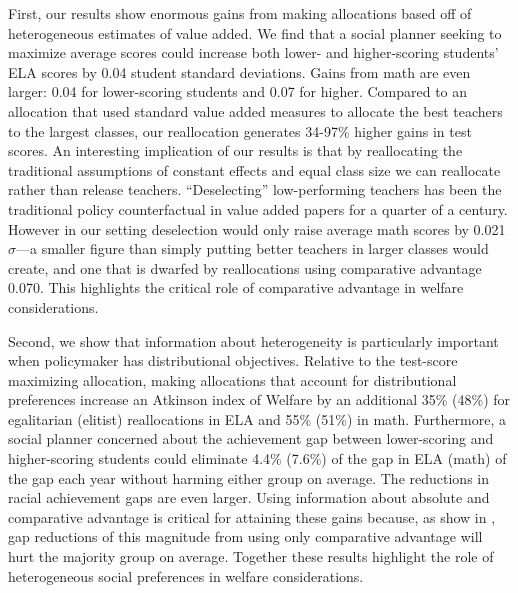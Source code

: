 \documentclass[12pt]{article}
\theoremstyle{definition}
\theoremstyle{definition}
\theoremstyle{definition}
\theoremstyle{definition}
\begin{document}
First, our results show enormous gains from making allocations based off of heterogeneous estimates of value added. We find that a social planner seeking to maximize average scores could increase both lower- and higher-scoring students' ELA scores by 0.04 student standard deviations. Gains from math are even larger: 0.04 for lower-scoring students and 0.07 for higher. Compared to an allocation that used standard value added measures to allocate the best teachers to the largest classes, our reallocation generates 34-97\% higher gains in test scores. An interesting implication of our results is that by reallocating the traditional assumptions of constant effects and equal class size we can reallocate rather than release teachers. ``Deselecting'' low-performing teachers has been the traditional policy counterfactual in value added papers for a quarter of a century. However in our setting deselection would only raise average math scores by 0.021 $\sigma$---a smaller figure than  simply putting better teachers in larger classes would create, and one that is dwarfed by reallocations using comparative advantage 0.070. This highlights the critical role of comparative advantage in welfare considerations. 

Second, we show that information about heterogeneity is particularly important when policymaker 
has distributional objectives. Relative to the test-score maximizing allocation, making allocations that account for distributional preferences increase an Atkinson index of Welfare by an additional 35\% (48\%) for egalitarian (elitist) reallocations in ELA and 55\% (51\%) in math. Furthermore, a social planner concerned about the achievement gap between lower-scoring and higher-scoring students could eliminate 4.4\% (7.6\%) of the gap in ELA (math) of the gap each year without harming either group on average. The reductions in racial achievement gaps are even larger. Using information about absolute and comparative advantage is critical for attaining these gains because, as show in \citet{Delgado2020}, gap reductions of this magnitude from using only comparative advantage will hurt the majority group on average. Together these results highlight the role of heterogeneous social preferences in welfare considerations.
\end{document}

